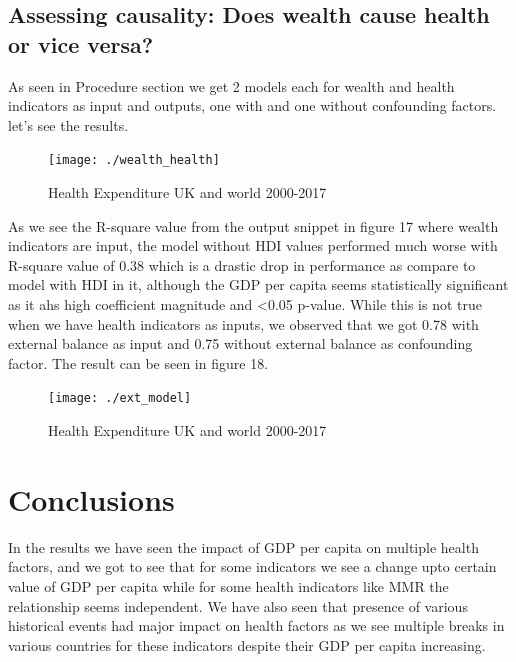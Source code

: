 \documentclass[
]{article}
\begin{document}
\hypertarget{assessing-causality-does-wealth-cause-health-or-vice-versa}{%
\subsection{Assessing causality: Does wealth cause health or vice
versa?}\label{assessing-causality-does-wealth-cause-health-or-vice-versa}}

As seen in Procedure section we get 2 models each for wealth and health
indicators as input and outputs, one with and one without confounding
factors. let's see the results.

\begin{figure}[H]

{\centering \texttt{[image: ./wealth\_health]} 

}

\caption{Health Expenditure UK and world 2000-2017}\label{fig:plot17}
\end{figure}

As we see the R-square value from the output snippet in figure 17 where
wealth indicators are input, the model without HDI values performed much
worse with R-square value of 0.38 which is a drastic drop in performance
as compare to model with HDI in it, although the GDP per capita seems
statistically significant as it ahs high coefficient magnitude and
\textless0.05 p-value. While this is not true when we have health
indicators as inputs, we observed that we got 0.78 with external balance
as input and 0.75 without external balance as confounding factor. The
result can be seen in figure 18.

\begin{figure}[H]

{\centering \texttt{[image: ./ext\_model]} 

}

\caption{Health Expenditure UK and world 2000-2017}\label{fig:plot18}
\end{figure}

\hypertarget{conclusions}{%
\section{Conclusions}\label{conclusions}}

In the results we have seen the impact of GDP per capita on multiple
health factors, and we got to see that for some indicators we see a
change upto certain value of GDP per capita while for some health
indicators like MMR the relationship seems independent. We have also
seen that presence of various historical events had major impact on
health factors as we see multiple breaks in various countries for these
indicators despite their GDP per capita increasing.
\end{document}
